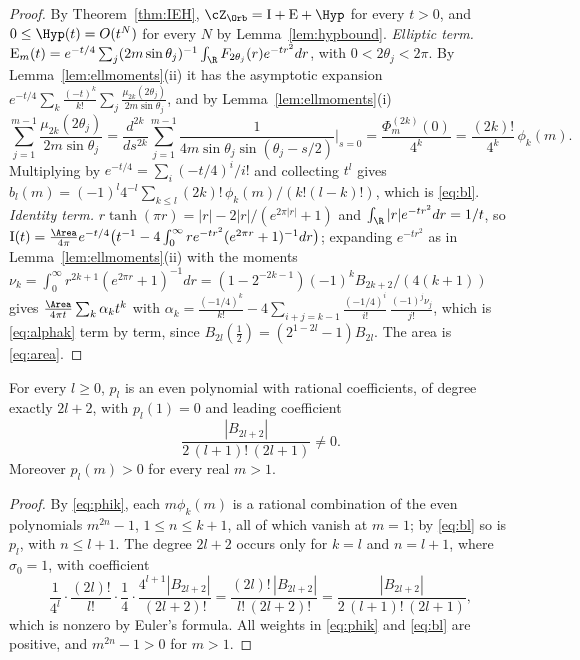 \begin{proof}
By Theorem~\ref{thm:IEH}, $\cZ_\Orb=\mathrm I+\mathrm E+\Hyp$ for every $t>0$, and
$0\le\Hyp(t)=O(t^N)$ for every $N$ by Lemma~\ref{lem:hypbound}.
\emph{Elliptic term.} $\mathrm E_m(t)=e^{-t/4}\sum_j(2m\sin\theta_j)^{-1}\int_\R F_{2\theta_j}(r)e^{-tr^2}dr$,
with $0<2\theta_j<2\pi$. By Lemma~\ref{lem:ellmoments}(ii) it has the asymptotic expansion
$e^{-t/4}\sum_k\frac{(-t)^k}{k!}\sum_j\frac{\mu_{2k}(2\theta_j)}{2m\sin\theta_j}$, and by
Lemma~\ref{lem:ellmoments}(i)
\[
  \sum_{j=1}^{m-1}\frac{\mu_{2k}(2\theta_j)}{2m\sin\theta_j}
  =\frac{d^{2k}}{ds^{2k}}\sum_{j=1}^{m-1}\frac1{4m\sin\theta_j\sin(\theta_j-s/2)}\Big|_{s=0}
  =\frac{\Phi_m^{(2k)}(0)}{4^k}=\frac{(2k)!}{4^k}\,\phi_k(m).
\]
Multiplying by $e^{-t/4}=\sum_i(-t/4)^i/i!$ and collecting $t^l$ gives
$b_l(m)=(-1)^l4^{-l}\sum_{k\le l}(2k)!\,\phi_k(m)/(k!(l-k)!)$, which is \eqref{eq:bl}.
\emph{Identity term.} $r\tanh(\pi r)=|r|-2|r|/(e^{2\pi|r|}+1)$ and $\int_\R|r|e^{-tr^2}dr=1/t$, so
$\mathrm I(t)=\frac{\Area}{4\pi}e^{-t/4}\big(t^{-1}-4\int_0^\infty re^{-tr^2}(e^{2\pi r}+1)^{-1}dr\big)$;
expanding $e^{-tr^2}$ as in Lemma~\ref{lem:ellmoments}(ii) with the moments
$\nu_k=\int_0^\infty r^{2k+1}(e^{2\pi r}+1)^{-1}dr=(1-2^{-2k-1})(-1)^kB_{2k+2}/(4(k+1))$ gives
$\frac{\Area}{4\pi t}\sum_k\alpha_kt^k$ with
$\alpha_k=\frac{(-1/4)^k}{k!}-4\sum_{i+j=k-1}\frac{(-1/4)^i}{i!}\,\frac{(-1)^j\nu_j}{j!}$, which is \eqref{eq:alphak}
term by term, since $B_{2l}(\frac12)=(2^{1-2l}-1)B_{2l}$.
The area is \eqref{eq:area}.
\end{proof}

\begin{lemma}\label{lem:conepoly}
For every $l\ge0$, $p_l$ is an even polynomial with rational coefficients, of degree exactly
$2l+2$, with $p_l(1)=0$ and leading coefficient
\[
  \frac{|B_{2l+2}|}{2\,(l+1)!\,(2l+1)}\ne0 .
\]
Moreover $p_l(m)>0$ for every real $m>1$.
\end{lemma}

\begin{proof}
By \eqref{eq:phik}, each $m\phi_k(m)$ is a rational combination of the even polynomials $m^{2n}-1$,
$1\le n\le k+1$, all of which vanish at $m=1$; by \eqref{eq:bl} so is $p_l$, with $n\le l+1$. The
degree $2l+2$ occurs only for $k=l$ and $n=l+1$, where $\sigma_0=1$, with coefficient
\[
  \frac1{4^l}\cdot\frac{(2l)!}{l!}\cdot\frac14\cdot\frac{4^{l+1}|B_{2l+2}|}{(2l+2)!}
  =\frac{(2l)!\,|B_{2l+2}|}{l!\,(2l+2)!}=\frac{|B_{2l+2}|}{2\,(l+1)!\,(2l+1)},
\]
which is nonzero by Euler's formula. All weights in \eqref{eq:phik} and \eqref{eq:bl} are positive,
and $m^{2n}-1>0$ for $m>1$.
\end{proof}

